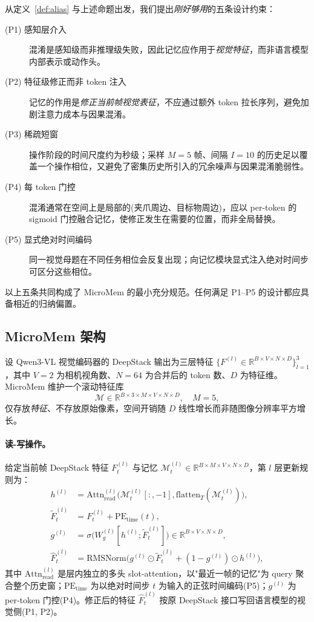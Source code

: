 \documentclass[11pt]{ctexart}
\begin{document}
从定义~\ref{def:alias} 与上述命题出发，我们提出\emph{刚好够用}的五条设计约束：

\begin{description}
    \item[(P1) 感知层介入] 混淆是感知级而非推理级失败，因此记忆应作用于\emph{视觉特征}，而非语言模型内部表示或动作头。
    \item[(P2) 特征级修正而非 token 注入] 记忆的作用是\emph{修正当前帧视觉表征}，不应通过额外 token 拉长序列，避免加剧注意力成本与因果混淆。
    \item[(P3) 稀疏短窗] 操作阶段的时间尺度约为秒级；采样 $M{=}5$ 帧、间隔 $I{=}10$ 的历史足以覆盖一个操作相位，又避免了密集历史所引入的冗余噪声与因果混淆脆弱性。
    \item[(P4) 每 token 门控] 混淆通常在空间上是局部的(夹爪周边、目标物周边)，应以 per-token 的 sigmoid 门控融合记忆，使修正发生在需要的位置，而非全局替换。
    \item[(P5) 显式绝对时间编码] 同一视觉母题在不同任务相位会反复出现；向记忆模块显式注入绝对时间步可区分这些相位。
\end{description}

以上五条共同构成了 MicroMem 的最小充分规范。任何满足 P1--P5 的设计都应具备相近的归纳偏置。

\subsection{MicroMem 架构}

设 Qwen3-VL 视觉编码器的 DeepStack 输出为三层特征 $\{F^{(l)} \in \mathbb{R}^{B \times V \times N \times D}\}_{l=1}^{3}$，其中 $V{=}2$ 为相机视角数、$N{=}64$ 为合并后的 token 数、$D$ 为特征维。MicroMem 维护一个滚动特征库
\[
\mathcal{M} \in \mathbb{R}^{B \times 3 \times M \times V \times N \times D}, \quad M{=}5,
\]
仅存放\emph{特征}、不存放原始像素，空间开销随 $D$ 线性增长而非随图像分辨率平方增长。

\paragraph{读-写操作。}
给定当前帧 DeepStack 特征 $F_t^{(l)}$ 与记忆 $\mathcal{M}_t^{(l)} \in \mathbb{R}^{B\times M\times V\times N\times D}$，第 $l$ 层更新规则为：
\begin{align}
h^{(l)} &= \mathrm{Attn}^{(l)}_\text{read}\bigl(\mathcal{M}_t^{(l)}[:,-1], \mathrm{flatten}_T(\mathcal{M}_t^{(l)})\bigr),\\
\tilde F_t^{(l)} &= F_t^{(l)} + \mathrm{PE}_\text{time}(t),\\
g^{(l)} &= \sigma\bigl(W^{(l)}_g[h^{(l)};\tilde F_t^{(l)}]\bigr) \in \mathbb{R}^{B\times V\times N\times D},\\
\hat F_t^{(l)} &= \mathrm{RMSNorm}\bigl(g^{(l)} \odot \tilde F_t^{(l)} + (1-g^{(l)})\odot h^{(l)}\bigr),
\end{align}
其中 $\mathrm{Attn}^{(l)}_\text{read}$ 是层内独立的多头 slot-attention，以"最近一帧的记忆"为 query 聚合整个历史窗；$\mathrm{PE}_\text{time}$ 为以绝对时间步 $t$ 为输入的正弦时间编码(P5)；$g^{(l)}$ 为 per-token 门控(P4)。修正后的特征 $\hat F_t^{(l)}$ 按原 DeepStack 接口写回语言模型的视觉侧(P1, P2)。
\end{document}

